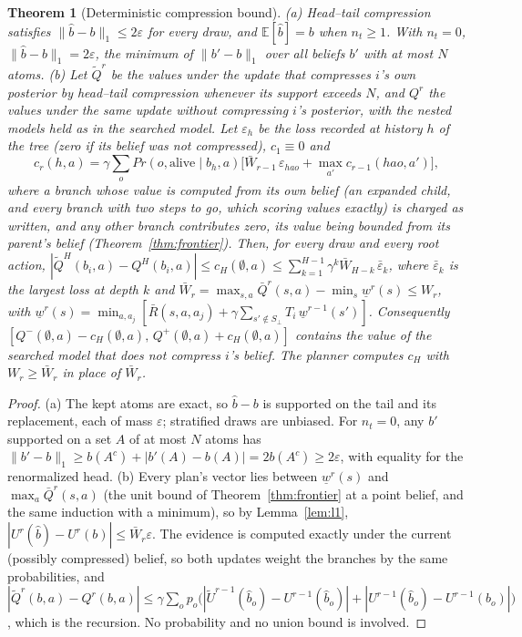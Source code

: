 \documentclass{article}
\renewcommand{\Pr}{\mathit{Pr}}
\newtheorem{theorem}{Theorem}
\begin{document}
\begin{theorem}[Deterministic compression bound]\label{thm:compress-det}
(a) Head--tail compression satisfies $\|\hat b-b\|_1\le2\varepsilon$ for every draw, and
$\mathbb E[\hat b]=b$ when $n_t\ge1$. With $n_t=0$, $\|\hat b-b\|_1=2\varepsilon$, the minimum of
$\|b'-b\|_1$ over all beliefs $b'$ with at most $N$ atoms.
(b) Let $\widetilde Q^r$ be the values under the update that compresses $i$'s own posterior by head--tail
compression whenever its support exceeds $N$, and $Q^r$ the values under the same update without compressing
$i$'s posterior, with the nested models held as in the searched model. Let $\varepsilon_h$ be the loss
recorded at history $h$ of the tree (zero if its belief was not compressed), $c_1\equiv0$ and
\[
c_r(h,a)=\gamma\sum_o\Pr(o,\mathrm{alive}\mid b_h,a)\big[\bar W_{r-1}\,\varepsilon_{hao}+\max_{a'}c_{r-1}(hao,a')\big],
\]
where a branch whose value is computed from its own belief (an expanded child, and every branch with two steps
to go, which scoring values exactly) is charged as written, and any other branch contributes zero, its value
being bounded from its parent's belief (Theorem~\ref{thm:frontier}). Then, for every draw and every root action,
$|\widetilde Q^H(b_i,a)-Q^H(b_i,a)|\le c_H(\emptyset,a)\le\sum_{k=1}^{H-1}\gamma^k\bar W_{H-k}\,
\bar\varepsilon_k$, where $\bar\varepsilon_k$ is the largest loss at depth $k$ and
$\bar W_r=\max_{s,a}\bar Q^r(s,a)-\min_s\underline w^r(s)\le W_r$, with
$\underline w^r(s)=\min_{a,a_j}[\bar R(s,a,a_j)+\gamma\sum_{s'\notin S_\bot}T_i\,\underline w^{r-1}(s')]$.
Consequently $[Q^-(\emptyset,a)-c_H(\emptyset,a),\,Q^+(\emptyset,a)+c_H(\emptyset,a)]$ contains the value of
the searched model that does not compress $i$'s belief. The planner computes $c_H$ with $W_r \geq \bar W_r$ in place of $\bar W_r$.
\end{theorem}
\begin{proof}
(a) The kept atoms are exact, so $\hat b-b$ is supported on the tail and its replacement, each of mass
$\varepsilon$; stratified draws are unbiased. For $n_t=0$, any $b'$ supported on a set $A$ of at most $N$
atoms has $\|b'-b\|_1\ge b(A^c)+|b'(A)-b(A)|=2b(A^c)\ge2\varepsilon$, with equality for the renormalized head.
(b) Every plan's vector lies between $\underline w^r(s)$ and $\max_a\bar Q^r(s,a)$ (the unit bound of
Theorem~\ref{thm:frontier} at a point belief, and the same induction with a minimum), so by
Lemma~\ref{lem:l1}, $|U^{r}(\hat b)-U^{r}(b)|\le\bar W_r\varepsilon$. The evidence is computed exactly under the
current (possibly compressed) belief, so both updates weight the branches by the same probabilities, and
$|\widetilde Q^r(b,a)-Q^r(b,a)|\le\gamma\sum_op_o\big(|\widetilde U^{r-1}(\hat b_o)-U^{r-1}(\hat b_o)|
+|U^{r-1}(\hat b_o)-U^{r-1}(b_o)|\big)$, which is the recursion. No probability and no union bound is involved.
\end{proof}
\end{document}
